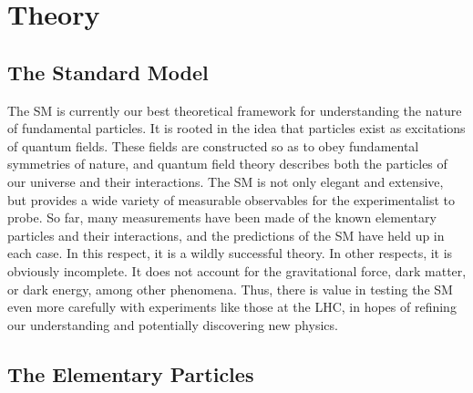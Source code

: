 \chapter{Theory}\label{sec:theory}

\section{The Standard Model}

The SM is currently our best theoretical framework for understanding the nature of fundamental particles. 
It is rooted in the idea that particles exist as excitations of quantum fields. These fields are constructed so as to obey 
fundamental symmetries of nature, and quantum field theory describes both the particles of our universe and their interactions. The SM is not only 
elegant and extensive, but provides a wide variety of measurable observables for the experimentalist to probe. So far, many 
measurements have been made of the known elementary particles and their interactions, and the predictions of the SM have held up in each case. In 
this respect, it is a wildly successful theory. In other respects, it is obviously incomplete. It does not account for the gravitational force, dark matter, or dark energy, among other phenomena. 
Thus, there is value in testing the SM even more carefully with experiments 
like those at the LHC, in hopes of refining our understanding and potentially discovering new physics. 

\section{The Elementary Particles} 

